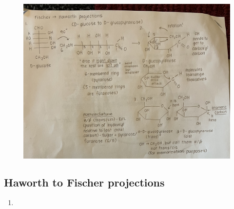 \documentclass[letterpaper, 12pt]{article}
\begin{document}
\begin{figure}[H]
\centering
\includegraphics[width=\textwidth]{fth}
\end{figure}

\subsection*{Haworth to Fischer projections}

\begin{enumerate}
\item 
\end{enumerate}
\end{document}
